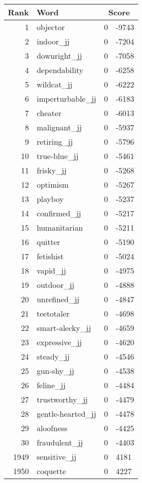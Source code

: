 \begin{longtable}[!htbp]{| rlr@{.}l |}
    \hline
    \textbf{Rank} & \textbf{Word} & \multicolumn{2}{c|}{\textbf{Score}} \\
    \hline
    \endhead
    1 & objector & 0 & -9743 \\
    2 & indoor\_jj & 0 & -7204 \\
    3 & downright\_jj & 0 & -7058 \\
    4 & dependability & 0 & -6258 \\
    5 & wildcat\_jj & 0 & -6222 \\
    6 & imperturbable\_jj & 0 & -6183 \\
    7 & cheater & 0 & -6013 \\
    8 & malignant\_jj & 0 & -5937 \\
    9 & retiring\_jj & 0 & -5796 \\
    10 & true-blue\_jj & 0 & -5461 \\
    11 & frisky\_jj & 0 & -5268 \\
    12 & optimism & 0 & -5267 \\
    13 & playboy & 0 & -5237 \\
    14 & confirmed\_jj & 0 & -5217 \\
    15 & humanitarian & 0 & -5211 \\
    16 & quitter & 0 & -5190 \\
    17 & fetishist & 0 & -5024 \\
    18 & vapid\_jj & 0 & -4975 \\
    19 & outdoor\_jj & 0 & -4888 \\
    20 & unrefined\_jj & 0 & -4847 \\
    21 & teetotaler & 0 & -4698 \\
    22 & smart-alecky\_jj & 0 & -4659 \\
    23 & expressive\_jj & 0 & -4620 \\
    24 & steady\_jj & 0 & -4546 \\
    25 & gun-shy\_jj & 0 & -4538 \\
    26 & feline\_jj & 0 & -4484 \\
    27 & trustworthy\_jj & 0 & -4479 \\
    28 & gentle-hearted\_jj & 0 & -4478 \\
    29 & aloofness & 0 & -4425 \\
    30 & fraudulent\_jj & 0 & -4403 \\
    1949 & sensitive\_jj & 0 & 4181 \\
    1950 & coquette & 0 & 4227 \\

\end{longtable}
